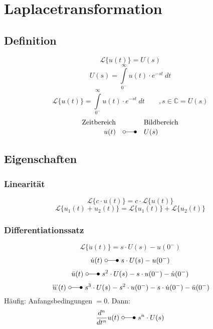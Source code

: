 



\chapter{Laplacetransformation}


\section{Definition}
\[ 
    \mathcal{L} \lbrace u(t) \rbrace = U(s)
\]
\[ 
    U(s) = \int\limits_{0^-}^{\infty} u(t) \cdot e^{-st} ~ dt 
\]
\[ 
    \mathcal{L} \lbrace u(t) \rbrace 
    = \int\limits_{0^-}^{\infty} u(t) \cdot e^{-st} ~ dt \qquad , s \in \mathbb{C} 
    = U(s) 
\]
\[ 
    \begin{array}{rcl}
        \text{Zeitbereich} &  & \text{Bildbereich} \\
        u(t) & \laplace & U(s)
    \end{array} 
\]

\section{Eigenschaften }


\subsection{Linearität}
\[ 
    \mathcal{L}\lbrace c \cdot u(t) \rbrace 
    = c \cdot \mathcal{L}\lbrace u(t) \rbrace 
\]
\[ 
    \mathcal{L}\lbrace u_1(t) + u_2(t) \rbrace 
    = \mathcal{L}\lbrace u_1(t) \rbrace + \mathcal{L}\lbrace u_2(t) \rbrace 
\]

\subsection{Differentiationssatz}
\[ 
    \mathcal{L}\lbrace \dot{u}(t) \rbrace = s \cdot U(s) - u(0^-) 
\]
\[ 
    \dot{u}(t) ~ \laplace ~ s \cdot U(s) - u(0^-) 
\]
\[ 
    \ddot{u}(t) ~ \laplace ~ s^2 \cdot U(s) - s \cdot u(0^-) 
    - \dot{u}(0^-)
\]
\[ 
    \dddot{u}(t) ~ \laplace ~ s^3 \cdot U(s) - s^2 \cdot u(0^-) 
    - s \cdot \dot{u}(0^-) - \ddot{u}(0^-) 
\]
Häufig: Anfangsbedingungen $= 0$.
Dann:
\[ 
    \frac{d^n}{dt^n} u(t) ~ \laplace ~ s^n \cdot U(s) 
\]

